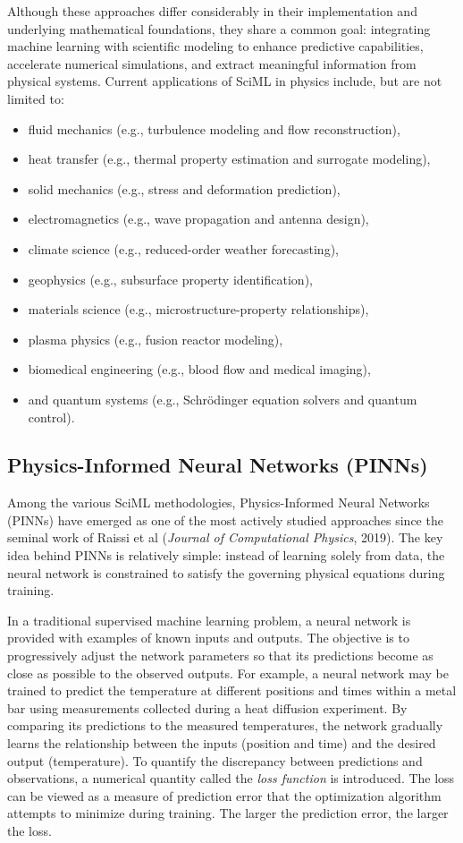 Although these approaches differ considerably in their implementation and underlying mathematical foundations, they share a common goal: integrating machine learning with scientific modeling to enhance predictive capabilities, accelerate numerical simulations, and extract meaningful information from physical systems. Current applications of SciML in physics include, but are not limited to:

\begin{itemize}
\item fluid mechanics (e.g., turbulence modeling and flow reconstruction),
\item heat transfer (e.g., thermal property estimation and surrogate modeling),
\item solid mechanics (e.g., stress and deformation prediction),
\item electromagnetics (e.g., wave propagation and antenna design),
\item climate science (e.g., reduced-order weather forecasting),
\item geophysics (e.g., subsurface property identification),
\item materials science (e.g., microstructure-property relationships),
\item plasma physics (e.g., fusion reactor modeling),
\item biomedical engineering (e.g., blood flow and medical imaging),
\item and quantum systems (e.g., Schrödinger equation solvers and quantum control).
\end{itemize}

\subsection{Physics-Informed Neural Networks (PINNs)}

Among the various SciML methodologies, Physics-Informed Neural Networks (PINNs) have emerged as one of the most actively studied approaches since the seminal work of Raissi et al (\textit{Journal of Computational Physics}, 2019). The key idea behind PINNs is relatively simple: instead of learning solely from data, the neural network is constrained to satisfy the governing physical equations during training.

In a traditional supervised machine learning problem, a neural network is provided with examples of known inputs and outputs. The objective is to progressively adjust the network parameters so that its predictions become as close as possible to the observed outputs. For example, a neural network may be trained to predict the temperature at different positions and times within a metal bar using measurements collected during a heat diffusion experiment. By comparing its predictions to the measured temperatures, the network gradually learns the relationship between the inputs (position and time) and the desired output (temperature). To quantify the discrepancy between predictions and observations, a numerical quantity called the \textit{loss function} is introduced. The loss can be viewed as a measure of prediction error that the optimization algorithm attempts to minimize during training. The larger the prediction error, the larger the loss.

